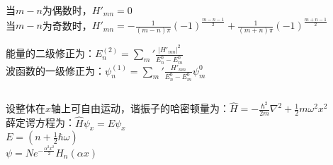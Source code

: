当$m-n$为偶数时，$H'_{mn}=0$ \\

当$m-n$为奇数时，$\displaystyle H'_{mn} = -\frac{1}{(m-n)\pi}(-1)^{\frac{m-n-1}{2}}+\frac{1}{(m+n)\pi}(-1)^{\frac{m+n-1}{2}} $

能量的二级修正为：$\displaystyle E^{(2)}_{n}= \sum_{m}' \frac{\lvert H'_{mn}\rvert ^{2}}{E^0_{n}-E^0_{m}} $ \\

波函数的一级修正为：$\displaystyle \psi^{(1)}_{n}= \sum_{m}' \frac{H'_{mn}}{E^0_{n}-E^0_{m}} \psi^{0}_{m} $
\subsection{ }
设整体在$x$轴上可自由运动，谐振子的哈密顿量为：$\displaystyle \hat{H} = -\frac{\hbar^{2}}{2m} \nabla^{2}+\frac{1}{2}m\omega^{2}x^{2} $ \\

薛定谔方程为：$\hat{H}\psi_{x} = E\psi_{x}$ \\

$\displaystyle E=(n+\frac{1}{2} \hbar \omega)$ \\

$\displaystyle \psi = Ne^{-\frac{\alpha^{2}x^{2}}{2}}H_{n}(\alpha x)$
